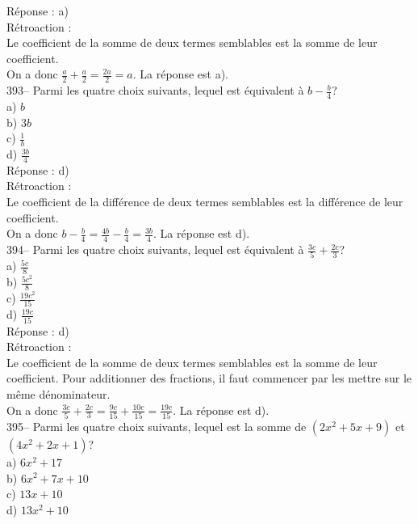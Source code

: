 ﻿\documentclass[letterpaper, 12pt]{article}
\begin{document}
R\'eponse : a)\\

R\'etroaction : \\
Le coefficient de la somme de deux termes semblables est la somme de leur
coefficient.\\[2mm]
On a donc $\frac{a}{2}+\frac{a}{2}=\frac{2a}{2}=a$.  La r\'eponse est a).\\

393-- Parmi les quatre choix suivants, lequel est \'equivalent \`a
$b-\frac{b}{4}$?\\
a) $b$\\[2mm]
b) $3b$\\[2mm]
c) $\frac{1}{b}$\\[2mm]
d) $\frac{3b}{4}$\\

R\'eponse : d)\\

R\'etroaction : \\
Le coefficient de la diff\'erence de deux termes semblables est la
diff\'erence de leur coefficient.\\[2mm]
On a donc $b-\frac{b}{4}=\frac{4b}{4}-\frac{b}{4}=\frac{3b}{4}$.  La
r\'eponse est d).\\

394-- Parmi les quatre choix suivants, lequel est \'equivalent \`a
$\frac{3c}{5}+\frac{2c}{3}$?\\
a) $\frac{5c}{8}$\\[2mm]
b) $\frac{5c^{2}}{8}$\\[2mm]
c) $\frac{19c^{2}}{15}$\\[2mm]
d) $\frac{19c}{15}$\\

R\'eponse : d)\\

R\'etroaction : \\
Le coefficient de la somme de deux termes semblables est la somme de leur
coefficient.  Pour additionner des fractions, il faut commencer par les
mettre sur le m\^eme d\'enominateur.\\[2mm]
On a donc
$\frac{3c}{5}+\frac{2c}{3}=\frac{9c}{15}+\frac{10c}{15}=\frac{19c}{15}$.  La
r\'eponse est d).\\

395-- Parmi les quatre choix suivants, lequel est la somme de
$(2x^{2}+5x+9)$ et $(4x^{2}+2x+1)$?\\
a) $6x^{2}+17$\\
b) $6x^{2}+7x+10$\\
c) $13x+10$\\
d) $13x^{2}+10$\\
\end{document}
